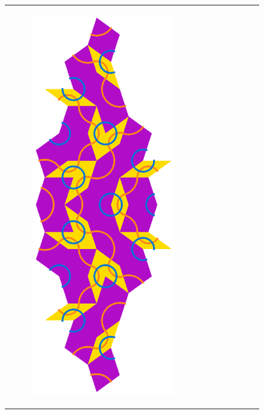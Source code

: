 \documentclass[]{article}
\begin{document}
\begin{figure}[H]
\begin{tabular}{cc}
\begin{subfigure}[b]{0.4\textwidth}
             \centering
             \includegraphics[scale=0.4]{SkinnyInflation4}
             \end{subfigure}   &
             \begin{subfigure}[b]{0.4\textwidth}

\end{subfigure}
\end{tabular}
\end{figure}
\end{document}
